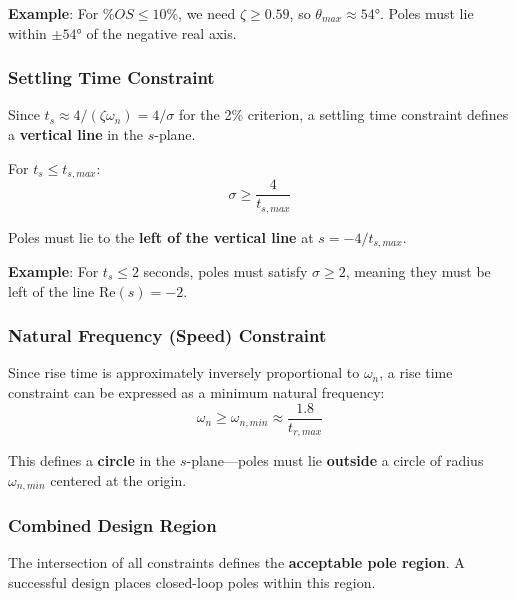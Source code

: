 \textbf{Example}: For $\%OS \leq 10\%$, we need $\zeta \geq 0.59$, so $\theta_{max} \approx 54°$. Poles must lie within $\pm 54°$ of the negative real axis.

\subsubsection{Settling Time Constraint}

Since $t_s \approx 4/(\zeta\omega_n) = 4/\sigma$ for the 2\% criterion, a settling time constraint defines a \textbf{vertical line} in the $s$-plane.

For $t_s \leq t_{s,max}$:
\begin{equation}
    \sigma \geq \frac{4}{t_{s,max}}
\end{equation}

Poles must lie to the \textbf{left of the vertical line} at $s = -4/t_{s,max}$.

\textbf{Example}: For $t_s \leq 2$ seconds, poles must satisfy $\sigma \geq 2$, meaning they must be left of the line $\text{Re}(s) = -2$.

\subsubsection{Natural Frequency (Speed) Constraint}

Since rise time is approximately inversely proportional to $\omega_n$, a rise time constraint can be expressed as a minimum natural frequency:
\begin{equation}
    \omega_n \geq \omega_{n,min} \approx \frac{1.8}{t_{r,max}}
\end{equation}

This defines a \textbf{circle} in the $s$-plane---poles must lie \textbf{outside} a circle of radius $\omega_{n,min}$ centered at the origin.

\subsubsection{Combined Design Region}

The intersection of all constraints defines the \textbf{acceptable pole region}. A successful design places closed-loop poles within this region.

